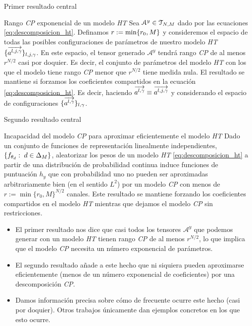 \begin{frame}{Primer resultado central}

	\begin{block}{Rango \textit{CP} exponencial de un modelo \textit{HT}}
		Sea $\mathcal{A}^y \in \mathcal{T}_{N, M}$ dado por las ecuaciones \eqref{eq:descomposicion_ht}. Definamos $r := \min \{ r_0, M \}$ y consideremos el espacio de todas las posibles configuraciones de parámetros de nuestro modelo \textit{HT} $\{  \overrightarrow{a^{l, j, \gamma}} \}_{l, j, \gamma}$. En este espacio, el tensor generado $\mathcal{A}^y$ tendrá rango \textit{CP} de al menos $r^{N/2}$ casi por doquier. Es decir, el conjunto de parámetros del modelo \textit{HT} con los que el modelo tiene rango \textit{CP} menor que $r^{N/2}$ tiene medida nula. El resultado se mantiene si forzamos los coeficientes compartidos en la ecuación \eqref{eq:descomposicion_ht}. Es decir, haciendo $\overrightarrow{a^{l, \gamma}} \equiv \overrightarrow{a^{l, j, \gamma}}$ y considerando el espacio de configuraciones $\{ \overrightarrow{a^{l, \gamma}}  \}_{l, \gamma}$.

	\end{block}


\end{frame}

\begin{frame}{Segundo resultado central}

	\begin{block}{Incapacidad del modelo \textit{CP} para aproximar eficientemente el modelo \textit{HT}}
		Dado un conjunto de funciones de representación linealmente independientes, $\{ f_{\theta_d}: \; d \in \Delta_{M} \}$, aleatorizar los pesos de un modelo \textit{HT} \eqref{eq:descomposicion_ht} a partir de una distribución de probabilidad continua induce funciones de puntuación $h_y$ que con probabilidad uno no pueden ser aproximadas arbitrariamente bien (en el sentido $L^2$) por un modelo \textit{CP} con menos de $r := \min \{r_0, M \}^{N/2}$ canales. Este resultado se mantiene forzando los coeficientes compartidos en el modelo \textit{HT} mientras que dejamos el modelo \textit{CP} sin restricciones.
	\end{block}

\end{frame}

\begin{frame}
	\begin{itemize}
		\item El primer resultado nos dice que casi todos los tensores $\mathcal{A}^y$ que podemos generar con un modelo \textit{HT} tienen rango \textit{CP} de al menos $r^{N/2}$, lo que implica que el modelo \textit{CP} necesita un número exponencial de parámetros.
		\item El segundo resultado añade a este hecho que ni siquiera pueden aproximarse eficientemente (menos de un número exponencial de coeficientes) por una descomposición \textit{CP}.
		\item Damos información precisa sobre cómo de frecuente ocurre este hecho (casi por doquier). Otros trabajos \cite{matematicas:descomposicion_ht} únicamente dan ejemplos concretos en los que esto ocurre.
	\end{itemize}
\end{frame}
